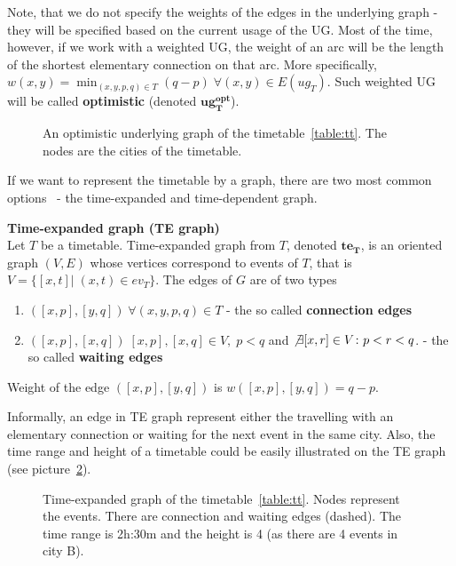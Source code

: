     \noindent Note, that we do not specify the weights of the edges in the underlying graph - they will be specified based on the current usage of the UG. Most of the time, however, if we work with a weighted UG, the weight of an arc will be the length of the shortest elementary connection on that arc. More specifically, $w(x, y) = \min_{(x, y, p, q) \in T} (q - p) \; \forall (x, y) \in E(ug_{T})$. Such weighted UG will be called \textbf{optimistic} (denoted $\bm{ug_{T}^{opt}}$).
    
    \begin{figure}[h!]
        \begin{center}
        \end{center}
		\caption{\label{fig:ug} An optimistic underlying graph of the timetable~\ref{table:tt}. The nodes are the \textcolor{city-clr}{cities} of the timetable.}
	\end{figure}
	
	\noindent If we want to represent the timetable by a graph, there are two most common options~\cite{timetablemodelsalgs07} - the time-expanded and time-dependent graph.
	
	\begin{definition}
		\textbf{Time-expanded graph (TE graph)} \\
        Let $T$ be a timetable. Time-expanded graph from $T$, denoted $\bm{te_{T}}$, is an oriented graph $(V, E)$ whose vertices correspond to events of $T$, that is $V = \{[x, t]| \; (x, t) \in ev_{T}\}$. The edges of $G$ are of two types
        \begin{enumerate}
            \item $([x, p], [y, q]) \; \forall (x, y, p, q) \in T$ - the so called \textbf{connection edges}
            \item $([x, p], [x, q]) \; [x, p], [x, q] \in V, \; p < q$ and $\not \exists [x, r] \in V\colon p < r < q$. - the so called \textbf{waiting edges}
		\end{enumerate}
        Weight of the edge $([x, p], [y, q])$ is $w([x, p], [y, q]) = q - p$.
	\end{definition}
	
	\noindent Informally, an edge in TE graph represent either the travelling with an elementary connection or waiting for the next event in the same city. Also, the time range and height of a timetable could be easily illustrated on the TE graph (see picture~\ref{pic:te}). 
	
	\begin{figure}[h!]
	    \begin{center}
	    \end{center}
    	\caption{\label{pic:te} Time-expanded graph of the timetable~\ref{table:tt}. Nodes represent the \textcolor{event-clr}{events}. There are \textcolor{elcon-clr}{connection} and \textcolor{waiting-clr}{waiting} edges (dashed). The time range is 2h:30m and the height is 4 (as there are 4 events in city B).}
	\end{figure}
        

